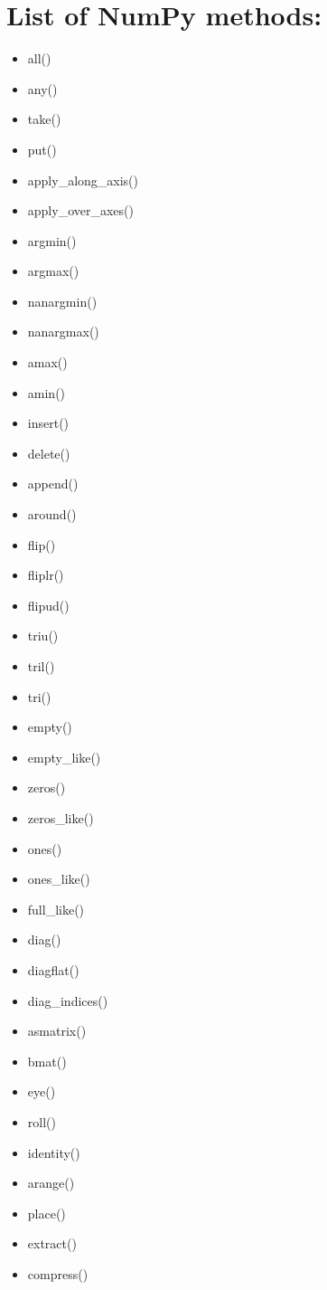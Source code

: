 \documentclass{article}
\begin{document}
\section{List of NumPy methods:}
\begin{itemize}
  \item all()
  \item any()
  \item take()
  \item put()
  \item apply\_along\_axis()
  \item apply\_over\_axes()
  \item argmin()
  \item argmax()
  \item nanargmin()
  \item nanargmax()
  \item amax()
  \item amin()
  \item insert()
  \item delete()
  \item append()
  \item around()
  \item flip()
  \item fliplr()
  \item flipud()
  \item triu()
  \item tril()
  \item tri()
  \item empty()
  \item empty\_like()
  \item zeros()
  \item zeros\_like()
  \item ones()
  \item ones\_like()
  \item full\_like()
  \item diag()
  \item diagflat()
  \item diag\_indices()
  \item asmatrix()
  \item bmat()
  \item eye()
  \item roll()
  \item identity()
  \item arange()
  \item place()
  \item extract()
  \item compress()

\end{itemize}
\end{document}
